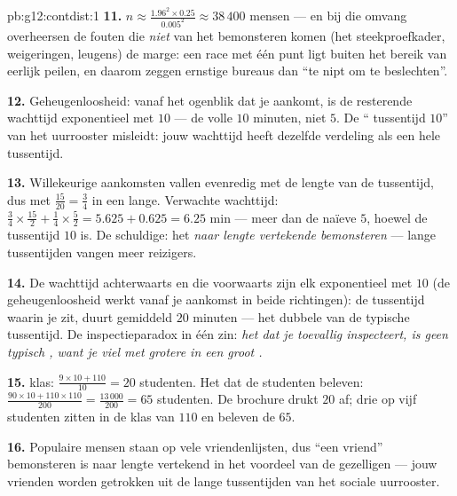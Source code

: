 \begin{solution}{pb:g12:contdist:1}
\textbf{11.} $n \approx \frac{1.96^2 \times 0.25}{0.005^2} \approx 38\,400$
mensen --- en bij die omvang overheersen de fouten die \emph{niet} van het
bemonsteren komen (het steekproefkader, weigeringen, leugens) de marge: een
race met één punt  ligt buiten het bereik van eerlijk peilen, en
daarom zeggen ernstige bureaus dan ``te nipt om te beslechten''.

\textbf{12.} Geheugenloosheid: vanaf het ogenblik dat je aankomt, is de
resterende wachttijd exponentieel met  $10$ --- de volle $10$
minuten, niet $5$. De `` tussentijd $10$'' van het uurrooster
misleidt: jouw wachttijd heeft dezelfde verdeling als een hele tussentijd.

\textbf{13.} Willekeurige aankomsten vallen evenredig met de lengte van de
tussentijd, dus met  $\frac{15}{20} = \frac34$ in een lange. Verwachte
wachttijd: $\frac34 \times \frac{15}{2} + \frac14 \times \frac52 =
5.625 + 0.625 = 6.25$ min --- meer dan de naïeve $5$, hoewel de 
tussentijd $10$ is. De schuldige: het \emph{naar lengte vertekende
bemonsteren} --- lange tussentijden vangen meer reizigers.

\textbf{14.} De wachttijd achterwaarts en die voorwaarts zijn elk exponentieel
met  $10$ (de geheugenloosheid werkt vanaf je aankomst in beide
richtingen): de tussentijd waarin je zit, duurt gemiddeld $20$ minuten --- het
dubbele van de typische tussentijd. De inspectieparadox in één zin: \emph{het
 dat je toevallig inspecteert, is geen typisch , want je viel
met grotere  in een groot .}

\textbf{15.}  klas: $\frac{9 \times 10 + 110}{10} = 20$ studenten.
Het  dat de studenten beleven:
$\frac{90 \times 10 + 110 \times 110}{200} = \frac{13\,000}{200} = 65$
studenten. De brochure drukt $20$ af; drie op vijf studenten zitten in de klas
van $110$ en beleven de $65$.

\textbf{16.} Populaire mensen staan op vele vriendenlijsten, dus ``een vriend''
bemonsteren is naar lengte vertekend in het voordeel van de gezelligen ---
jouw vrienden worden getrokken uit de lange tussentijden van het sociale
uurrooster.


\end{solution}
